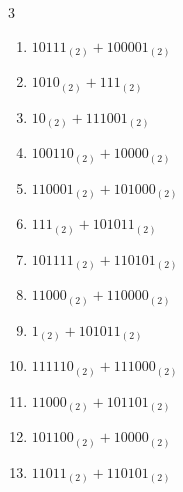 \begin{multicols}{3}
\begin{enumerate}

  \item $10111_{(2)} + 100001_{(2)}$


  \item $1010_{(2)} + 111_{(2)}$


  \item $10_{(2)} + 111001_{(2)}$


  \item $100110_{(2)} + 10000_{(2)}$


  \item $110001_{(2)} + 101000_{(2)}$


  \item $111_{(2)} + 101011_{(2)}$


  \item $101111_{(2)} + 110101_{(2)}$


  \item $11000_{(2)} + 110000_{(2)}$


  \item $1_{(2)} + 101011_{(2)}$


\columnbreak %

  \item $111110_{(2)} + 111000_{(2)}$


  \item $11000_{(2)} + 101101_{(2)}$


  \item $101100_{(2)} + 10000_{(2)}$


  \item $11011_{(2)} + 110101_{(2)}$



\end{enumerate}
\end{multicols}
